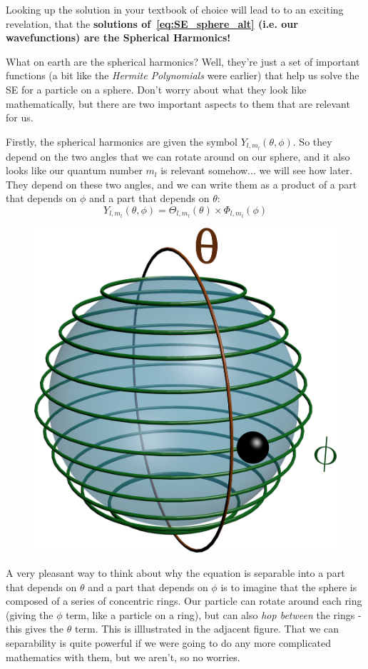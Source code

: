 \documentclass{memoir}[11pt,oneside,a4paper,openany]
\begin{document}
Looking up the solution in your textbook of choice will lead to to an exciting revelation, that the \textbf{solutions of~\autoref{eq:SE_sphere_alt} (i.e. our wavefunctions) are the Spherical Harmonics!}

What on earth are the spherical harmonics? Well, they're just a set of important functions (a bit like the \emph{Hermite Polynomials} were earlier) that help us solve the SE for a particle on a sphere. Don't worry about what they look like mathematically, but there are two important aspects to them that are relevant for us.

Firstly, the spherical harmonics are given the symbol $Y_{l,m_l}(\theta,\phi)$. So they depend on the two angles that we can rotate around on our sphere, and it also looks like our quantum number $m_l$ is relevant somehow... we will see how later. They depend on these two angles, and we can write them as a product of a part that depends on $\phi$ and a part that depends on $\theta$:
\begin{equation}
	Y_{l,m_l}(\theta,\phi) = \Theta_{l,m_l}(\theta)\times\Phi_{l,m_l}(\phi)
\end{equation}

\begin{figure}
	\centering
	\includegraphics[width=\linewidth]{particle_on_sphere_rings}
\end{figure}
A very pleasant way to think about why the equation is separable into a part that depends on $\theta$ and a part that depends on $\phi$ is to imagine that the sphere is composed of a series of concentric rings. Our particle can rotate around each ring (giving the $\phi$ term, like a particle on a ring), but can also \emph{hop between} the rings - this gives the $\theta$ term. This is illlustrated in the adjacent figure. That we can separability is quite powerful if we were going to do any more complicated mathematics with them, but we aren't, so no worries.
\end{document}
